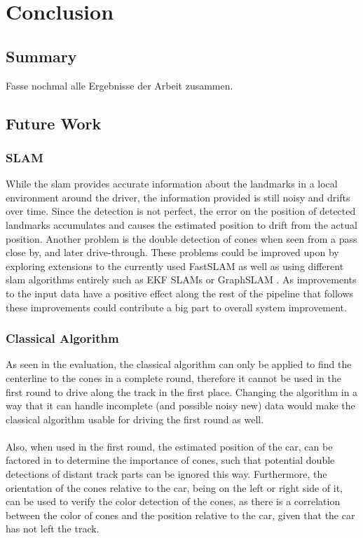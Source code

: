 \chapter{Conclusion}
\label{chap:end}

\section{Summary}
Fasse nochmal alle Ergebnisse der Arbeit zusammen.

\section{Future Work}
\subsection{SLAM}
While the \ac{slam} provides accurate information about the landmarks in a local environment around the driver, the information provided is still noisy and drifts over time. Since the detection is not perfect, the error on the position of detected landmarks accumulates and causes the estimated position to drift from the actual position. Another problem is the double detection of cones when seen from a pass close by, and later drive-through. These problems could be improved upon by exploring extensions to the currently used FastSLAM \cite{FastSLAM2002} as well as using different \ac{slam} algorithms entirely such as EKF SLAMs \cite{EKFSLAM1986} or GraphSLAM \cite{graphSLAM2006}. As improvements to the input data have a positive effect along the rest of the pipeline that follows these improvements could contribute a big part to overall system improvement.
\subsection{Classical Algorithm}
As seen in the evaluation, the classical algorithm can only be applied to find the centerline to the cones in a complete round, therefore it cannot be used in the first round to drive along the track in the first place. Changing the algorithm in a way that it can handle incomplete (and possible noisy new) data would make the classical algorithm usable for driving the first round as well. \\
\\Also, when used in the first round, the estimated position of the car, can be factored in to determine the importance of cones, such that potential double detections of distant track parts can be ignored this way. Furthermore, the orientation of the cones relative to the car, being on the left or right side of it, can be used to verify the color detection of the cones, as there is a correlation between the color of cones and the position relative to the car, given that the car has not left the track.
